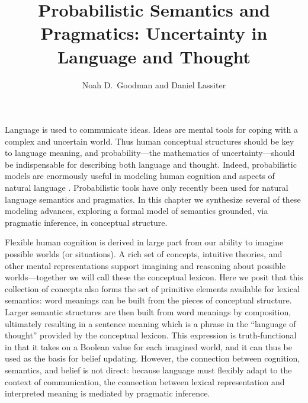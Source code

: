 \documentclass[pdfextras]{handbook}
\begin{document}
\linenumbers

\title*{Probabilistic Semantics and Pragmatics: Uncertainty in Language and Thought}


\author{Noah D.~Goodman
        and Daniel Lassiter}



\maketitle





Language is used to communicate ideas. Ideas are mental tools for coping with a complex and uncertain world. Thus human conceptual structures should be key to language meaning, and probability---the mathematics of uncertainty---should be indispensable for describing both language and thought. Indeed, probabilistic models are enormously useful in modeling human cognition \citep{tenenbaumetal11}
and aspects of natural language \citep{bodetal03,chater06}. Probabilistic tools have only recently been used for natural language semantics and pragmatics. In this chapter we synthesize several of these modeling advances, exploring a formal model of semantics grounded, via pragmatic inference, in conceptual structure.

Flexible human cognition is derived in large part from our ability to imagine possible worlds (or situations). 
A rich set of concepts, intuitive theories, and other mental representations support imagining and reasoning about possible worlds---together we will call these the conceptual lexicon. 
Here we posit that this collection of concepts also forms the set of primitive elements available for lexical semantics: word meanings can be built from the pieces of conceptual structure. Larger semantic structures are then built from word meanings by composition, ultimately resulting in a sentence meaning which is a phrase in the ``language of thought'' provided by the conceptual lexicon. This expression is truth-functional in that it takes on a Boolean value for each imagined world, and it can thus be used as the basis for belief updating.
However, the connection between cognition, semantics, and belief is not direct: 
because language must flexibly adapt to the context of communication, the connection between lexical representation and interpreted meaning is mediated by pragmatic inference.
\end{document}

